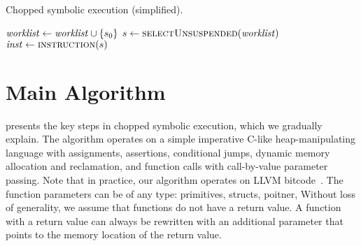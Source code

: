 
\begin{algorithm} %
\caption{Chopped symbolic execution (simplified).\label{fig:chopped-symbexe-recover}\label{fig:chopped-symbexe} }
\begin{algorithmic}[1]
  \State $\mathit{worklist} \gets \mathit{worklist} \cup \{ s_0\}$  \label{alg:seed-worklist}
  \While{$\worklist \neq \emptyset$}                     \label{alg:iterate-worklist}
    \State $\workstate \gets  \Call{selectUnsuspended}{\worklist}$ \label{alg:pop-worklist}
    \State $\inst \gets  \Call{instruction}{\workstate}$ \label{alg:get-switch-inst}

    \Switch{$\inst$} \label{alg:switch}
     \label{alg:casecall-begin}
    \EndCase \label{alg:casecall-end}
     \label{alg:caseload-begin}
    \EndCase \label{alg:caseload-end}
     \label{alg:casebranch-begin}
    \EndCase \label{alg:casebranch-end}
     \label{alg:casestore-begin}
    \EndCase \label{alg:casestore-end}
     \label{alg:caseexit-begin}
    \EndCase \label{alg:caseexit-end}
    \EndSwitch
  \EndWhile
  \EndFunction
\end{algorithmic}
\end{algorithm}


\section{Main Algorithm}\label{section:main-algorithm}

 presents the key steps in chopped
symbolic execution, which we gradually explain. The algorithm operates
on a simple imperative C-like heap-manipulating language with
assignments, assertions, conditional jumps, dynamic memory allocation
and reclamation, and function calls with call-by-value parameter
passing.
Note that in practice, our algorithm operates on LLVM bitcode~\cite{llvm}.
The function parameters can be of any type: primitives, structs, poitner, \etc
Without loss of generality, we assume that functions do not have a return value.
A function with a return value can always be rewritten with an additional parameter 
that points to the memory location of the return value.

